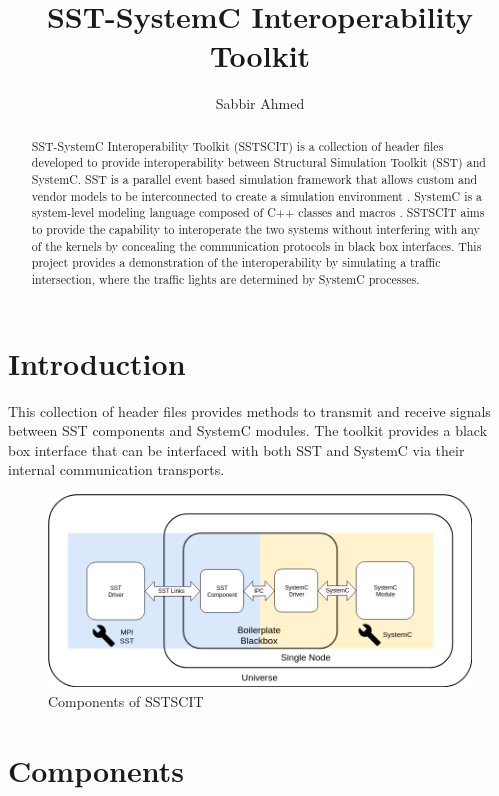 \documentclass{article}
\title{SST-SystemC Interoperability Toolkit}
\author{
  Sabbir Ahmed
}
\begin{document}
  \maketitle

  \begin{abstract}
    SST-SystemC Interoperability Toolkit (SSTSCIT) is a collection of header files developed to
    provide interoperability between Structural Simulation Toolkit (SST) and SystemC. SST is a
    parallel event based simulation framework that allows custom and vendor models to be
    interconnected to create a simulation environment \cite{sst}. SystemC is a system-level modeling
    language composed of C++ classes and macros \cite{sysc}. SSTSCIT aims to provide the capability
    to interoperate the two systems without interfering with any of the kernels by concealing the
    communication protocols in black box interfaces. This project provides a demonstration of the
    interoperability by simulating a traffic intersection, where the traffic lights are determined
    by SystemC processes.
  \end{abstract}

  \section{Introduction}
  This collection of header files provides methods to transmit and receive signals between SST
  components and SystemC modules. The toolkit provides a black box interface that can be interfaced
  with both SST and SystemC via their internal communication transports. 

  \begin{figure}[!h]
    \centering
    \includegraphics[width=6in]{diagrams/comm.png}
    \caption{Components of SSTSCIT}
    \label{fig:comm}
  \end{figure}

  \section{Components} \label{sec:comp}
\end{document}
